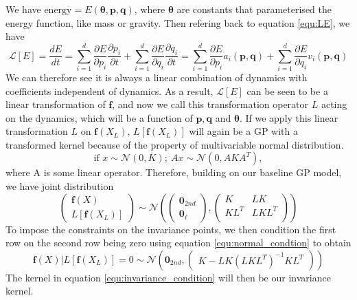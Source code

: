 \documentclass{statsmsc}
\begin{document}
We have $\text{energy}=E(\mathbf{\theta}, \mathbf{p}, \mathbf{q})$, where $\mathbf{\theta}$ are constants that parameterised the energy function, like mass or gravity.
Then refering back to equation \ref{equ:LE}, we have 
\begin{equation}
\mathcal{L}[E] = \frac{dE}{dt}=\sum_{i=1}^d \frac{\partial E}{\partial p_i} \frac{\partial p_i}{\partial t}+ \sum_{i=1}^d\frac{\partial E}{\partial q_i}\frac{\partial q_i}{\partial t} =\sum_{i=1}^d \frac{\partial E}{\partial p_i} a_i(\mathbf{p,q}) + \sum_{i=1}^d\frac{\partial E}{\partial q_i} v_i(\mathbf{p,q})
\label{equ:invariance_equation}
\end{equation}
We can therefore see it is always a linear combination of dynamics with coefficients independent of dynamics.
As a result, $\mathcal{L}[E]$ can be seen to be a linear transformation of $\mathbf{f}$, and now we call this transformation operator $L$ acting on the dynamics, which will be a function of $\mathbf{p}, \mathbf{q}$ and $\mathbf{\theta}$.
If we apply this linear transformation $L$ on $\mathbf{f}(X_L)$, $L[\mathbf{f}(X_L)]$ will again be a GP with a transformed kernel because of the property of multivariable normal distribution.
$$
\text{if } x\sim\mathcal{N}(0, K);\ Ax\sim\mathcal{N}(0, AKA^T),
$$
where A is some linear operator.
Therefore, building on our baseline GP model, we have joint distribution
\begin{equation}
\begin{pmatrix}
\mathbf{f}(X)\\L[\mathbf{f}(X_L)]
\end{pmatrix}
\sim\mathcal{N}
\left(\begin{pmatrix}\mathbf{0}_{2nd}\\\mathbf{0}_{\ell}\end{pmatrix}, \begin{pmatrix}
    K & LK \\
    KL^T & LKL^T\\
\end{pmatrix}\right)
\label{equ:invariance_joint}  
\end{equation}
To impose the constraints on the invariance points, we then condition the first row on the second row being zero using equation \ref{equ:normal_condtion} to obtain
\begin{equation}
  \mathbf{f}(X)|L[\mathbf{f}(X_L)]=0 \sim \mathcal{N} \left(\mathbf{0}_{2nd}, \begin{pmatrix}
    K-LK(LKL^T)^{-1}KL^T
  \end{pmatrix}\right)
  \label{equ:invariance_condition}
\end{equation}
The kernel in equation \ref{equ:invariance_condition} will then be our invariance kernel.
\end{document}
